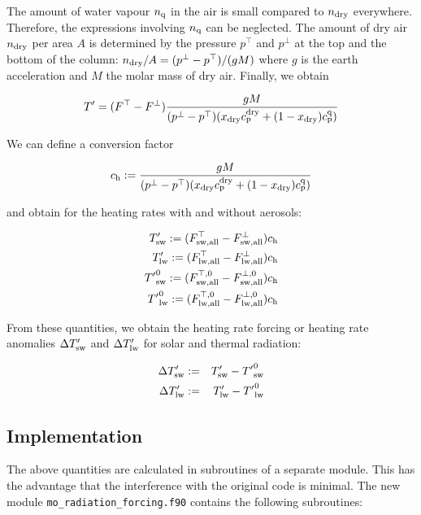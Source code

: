 \begin{appendix}
The amount of water vapour $n_{\rm q}$ in the air is small compared to
$n_{\rm dry}$  everywhere. Therefore, the expressions involving
$n_{\rm q}$ can be neglected.
The amount of dry air $n_{\rm dry}$ per area $A$ is determined by the pressure 
$p^\top$ and $p^\bot$ at the top and the bottom of the column:
$n_{\rm dry}/A=(p^\bot-p^\top)/(gM)$ where $g$ is the earth
acceleration and $M$ the molar mass of dry air. Finally, we obtain 

\begin{equation}
T'=(F^{\top}-F^{\bot})\frac{gM}{(p^\bot-p^\top)(x_{\rm dry}c_{\rm p}^{\rm dry}+
                                     (1-x_{\rm dry})c_{\rm p}^{\rm q})}
\end{equation}

We can define a conversion factor 

\begin{equation}\label{eqconvfac}
c_{\rm h}:=\frac{gM}{(p^\bot-p^\top)(x_{\rm dry}c_{\rm p}^{\rm dry}+
                                     (1-x_{\rm dry})c_{\rm p}^{\rm q})}
\end{equation}                   

and obtain for the heating rates with and without aerosols:

\begin{eqnarray*}
T'_{\rm sw}:= (F^{\top}_{\rm sw, all}-F^{\bot}_{\rm sw, all})c_{\rm h} \\
T'_{\rm lw}:=(F^{\top}_{\rm lw, all}-F^{\bot}_{\rm lw, all})c_{\rm h} \\
{T'}^0_{\rm sw}:= (F^{\top,0}_{\rm sw, all}-F^{\bot,0}_{\rm sw, all})c_{\rm h} \\
{T'}^0_{\rm lw}:=(F^{\top,0}_{\rm lw, all}-F^{\bot,0}_{\rm lw, all})c_{\rm h} \\
\end{eqnarray*}     

From these quantities, we obtain the heating rate forcing or heating
rate anomalies $\Delta
T'_{\rm sw}$ and $\Delta T'_{\rm lw}$ for solar and thermal radiation:

\begin{eqnarray}
\Delta T'_{\rm sw} & := & T'_{\rm sw}-{T'}^0_{\rm sw} \\
\Delta T'_{\rm lw} & := & T'_{\rm lw}-{T'}^0_{\rm lw}
\end{eqnarray}
  
\subsection{Implementation}

The above quantities are calculated in subroutines of a separate
module. This has the advantage that the interference with the original
\echam{} code is minimal. The new module {\tt mo\_radiation\_forcing.f90}
contains the following subroutines:


\end{appendix}
